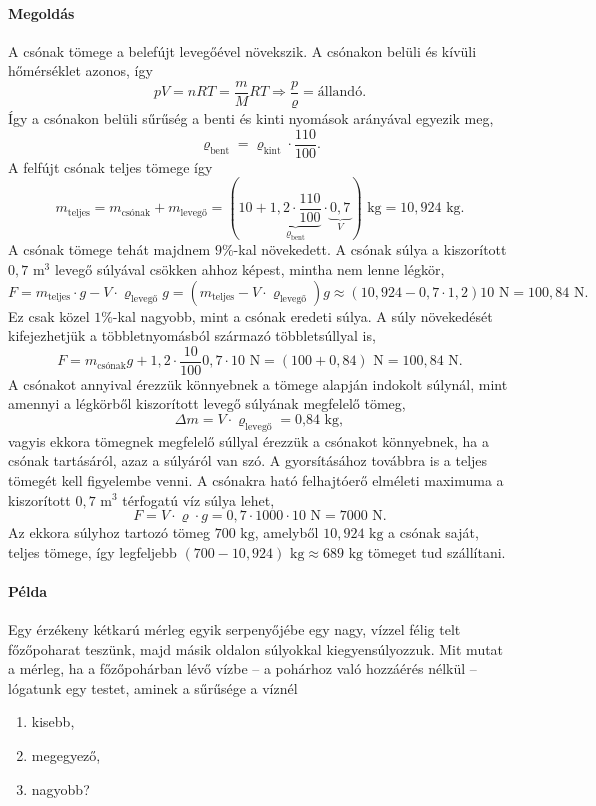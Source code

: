\documentclass[12pt,a4paper]{scrartcl}
\begin{document}
\paragraph{Megoldás}
A csónak tömege a belefújt levegőével növekszik. A csónakon belüli és kívüli hőmérséklet azonos, így
\[pV = nRT = \frac{m}{M}RT \Rightarrow \frac{p}{\varrho } = {\text{állandó}}.\]
Így a csónakon belüli sűrűség a benti és kinti nyomások arányával egyezik meg,
\[{\varrho _{{\text{bent}}}} = {\varrho _{{\text{kint}}}} \cdot \frac{{110}}{{100}}.\]
A felfújt csónak teljes tömege így
\[{m_{{\text{teljes}}}} = {m_\text{csónak}} + {m_\text{levegő}} = \left( {10 + \underbrace {1{,}2 \cdot \frac{{110}}{{100}}}_{{\varrho _{{\text{bent}}}}} \cdot \underbrace {0{,}7}_V} \right){\text{ kg}} = 10{,}924{\text{ kg}}.\]
A csónak tömege tehát majdnem $9\%$-kal növekedett. A csónak súlya a kiszorított $0{,}7\text{ m}^3$ levegő súlyával csökken ahhoz képest, mintha nem lenne légkör,
\[F = {m_\text{teljes}} \cdot g - V \cdot {\varrho _\text{levegő}}g = \left( {{m_\text{teljes}} - V \cdot {\varrho _\text{levegő}}} \right)g \approx \left( {10{,}924 - 0{,}7 \cdot 1{,}2} \right)10{\text{ N}} = 100{,}84{\text{ N}}.\]
Ez csak közel $1\%$-kal nagyobb, mint a csónak eredeti súlya. A súly növekedését kifejezhetjük a többletnyomásból származó többletsúllyal is,
\[F = m_\text{csónak}g + 1{,}2 \cdot \frac{{10}}{{100}}0{,}7 \cdot 10{\text{ N}} = \left( {100 + 0{,}84} \right){\text{ N}} = 100{,}84{\text{ N}}.\]
A csónakot annyival érezzük könnyebnek a tömege alapján indokolt súlynál, mint amennyi a légkörből kiszorított levegő súlyának megfelelő tömeg,
\[\Delta m = V \cdot {\varrho _\text{levegő}} = {\text{0{,}84 kg}},\]
vagyis ekkora tömegnek megfelelő súllyal érezzük a csónakot könnyebnek, ha a csónak tartásáról, azaz a súlyáról van szó. A gyorsításához továbbra is a teljes tömegét kell figyelembe venni. A csónakra ható felhajtóerő elméleti maximuma a kiszorított $0{,}7\text{ m}^3$ térfogatú víz súlya lehet,
\[F = V \cdot \varrho  \cdot g = 0{,}7 \cdot 1000 \cdot 10{\text{ N}} = 7000{\text{ N}}.\]
Az ekkora súlyhoz tartozó tömeg $700\text{ kg}$, amelyből $10{,}924{\text{ kg}}$ a csónak saját, teljes tömege, így legfeljebb $\left( {700 - 10,924} \right){\text{ kg}} \approx 689{\text{ kg}}$ tömeget tud szállítani.

\paragraph{Példa}
Egy érzékeny kétkarú mérleg egyik serpenyőjébe egy nagy, vízzel félig telt főzőpoharat teszünk, majd másik oldalon súlyokkal kiegyensúlyozzuk. Mit mutat a mérleg, ha a főzőpohárban lévő vízbe -- a pohárhoz való hozzáérés nélkül -- lógatunk egy testet, aminek a sűrűsége a víznél
\begin{enumerate}
\item kisebb,
\item megegyező,
\item nagyobb?
\end{enumerate}
\end{document}
